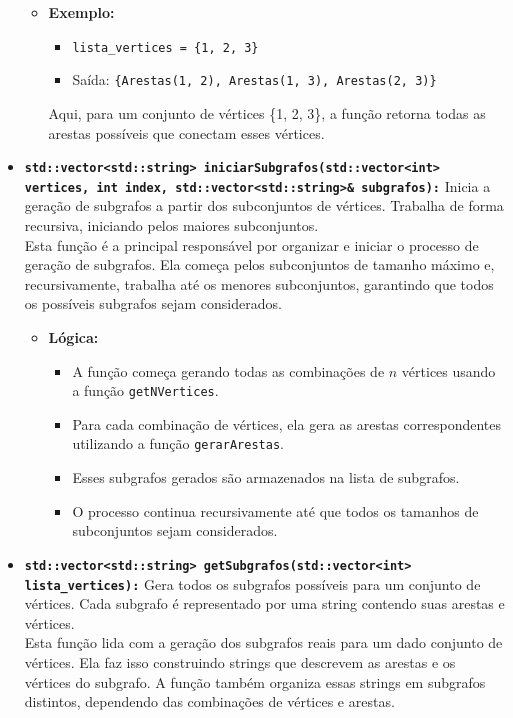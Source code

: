 \documentclass{article}
\begin{document}
\begin{itemize}
    \begin{itemize}
        \item \textbf{Exemplo:} 
        \begin{itemize}
            \item \texttt{lista\_vertices = \{1, 2, 3\}} 
            \item Saída: \texttt{\{\texttt{Arestas(1, 2)}, \texttt{Arestas(1, 3)}, \texttt{Arestas(2, 3)}\}} 
        \end{itemize}
        Aqui, para um conjunto de vértices \{1, 2, 3\}, a função retorna todas as arestas possíveis que conectam esses vértices.
    \end{itemize}
    
    \item \textbf{\texttt{std::vector<std::string> iniciarSubgrafos(std::vector<int> vertices, int index, std::vector<std::string>\& subgrafos):}} Inicia a geração de subgrafos a partir dos subconjuntos de vértices. Trabalha de forma recursiva, iniciando pelos maiores subconjuntos. \\
    Esta função é a principal responsável por organizar e iniciar o processo de geração de subgrafos. Ela começa pelos subconjuntos de tamanho máximo e, recursivamente, trabalha até os menores subconjuntos, garantindo que todos os possíveis subgrafos sejam considerados.

    \begin{itemize}
        \item \textbf{Lógica:} 
        \begin{itemize}
            \item A função começa gerando todas as combinações de \( n \) vértices usando a função \texttt{getNVertices}.
            \item Para cada combinação de vértices, ela gera as arestas correspondentes utilizando a função \texttt{gerarArestas}.
            \item Esses subgrafos gerados são armazenados na lista de subgrafos.
            \item O processo continua recursivamente até que todos os tamanhos de subconjuntos sejam considerados.
        \end{itemize}
    \end{itemize}
    
    \item \textbf{\texttt{std::vector<std::string> getSubgrafos(std::vector<int> lista\_vertices):}} Gera todos os subgrafos possíveis para um conjunto de vértices. Cada subgrafo é representado por uma string contendo suas arestas e vértices. \\
    Esta função lida com a geração dos subgrafos reais para um dado conjunto de vértices. Ela faz isso construindo strings que descrevem as arestas e os vértices do subgrafo. A função também organiza essas strings em subgrafos distintos, dependendo das combinações de vértices e arestas.


\end{itemize}
\end{document}
